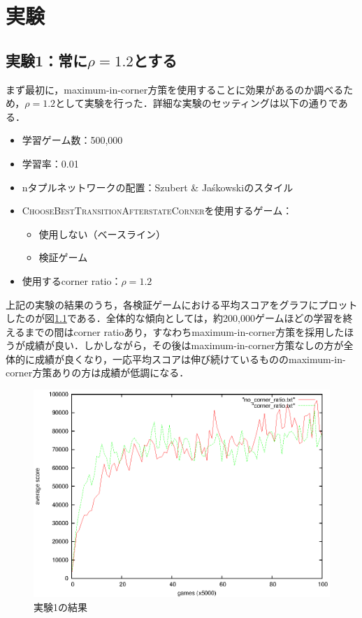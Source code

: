 \documentclass{suribt}
\begin{document}
\chapter{実験}
\section{実験1：常に${\rho}=1.2$とする}
まず最初に，maximum-in-corner方策を使用することに効果があるのか調べるため，${\rho}=1.2$として実験を行った．詳細な実験のセッティングは以下の通りである．

\begin{itemize}
\item 学習ゲーム数：500,000
\item 学習率：0.01
\item nタプルネットワークの配置：Szubert \& Ja\'{s}kowskiのスタイル
\item \textsc{ChooseBestTransitionAfterstateCorner}を使用するゲーム：
\begin{itemize}
\item 使用しない（ベースライン）
\item 検証ゲーム
\end{itemize}
\item 使用するcorner ratio：${\rho}=1.2$
\end{itemize}

上記の実験の結果のうち，各検証ゲームにおける平均スコアをグラフにプロットしたのが図\ref{figure_006}である．全体的な傾向としては，約200,000ゲームほどの学習を終えるまでの間はcorner ratioあり，すなわちmaximum-in-corner方策を採用したほうが成績が良い．しかしながら，その後はmaximum-in-corner方策なしの方が全体的に成績が良くなり，一応平均スコアは伸び続けているもののmaximum-in-corner方策ありの方は成績が低調になる．

\begin{figure}[t]
	\begin{center}
	\includegraphics[width=13cm]{figure_006.eps}
	\caption{実験1の結果}
	\label{figure_006}
	\end{center}
\end{figure}
\end{document}
